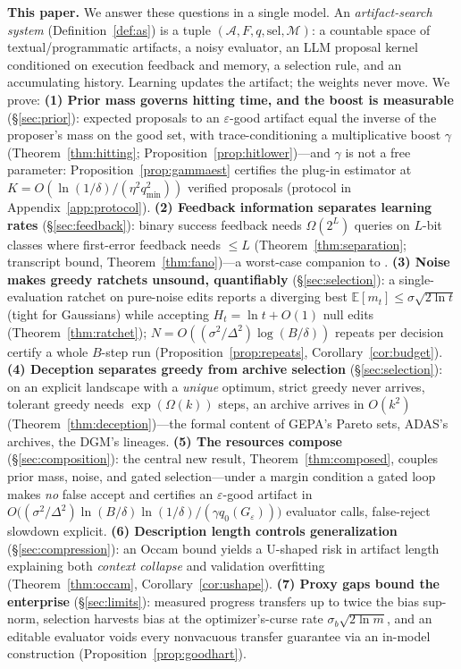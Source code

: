 \documentclass{article}
\theoremstyle{plain}
\theoremstyle{definition}
\theoremstyle{remark}
\newcommand{\A}{\mathcal{A}}
\newcommand{\M}{\mathcal{M}}
\newcommand{\E}{\mathbb{E}}
\newcommand{\sel}{\mathrm{sel}}
\newcommand{\eps}{\varepsilon}
\begin{document}
\textbf{This paper.} We answer these questions in a single model. An \emph{artifact-search system} (Definition~\ref{def:as}) is a tuple $(\A, F, q, \sel, \M)$: a countable space of textual/programmatic artifacts, a noisy evaluator, an LLM proposal kernel conditioned on execution feedback and memory, a selection rule, and an accumulating history. Learning updates the artifact; the weights never move. We prove:
\textbf{(1) Prior mass governs hitting time, and the boost is measurable} (\S\ref{sec:prior}): expected proposals to an $\eps$-good artifact equal the inverse of the proposer's mass on the good set, with trace-conditioning a multiplicative boost $\gamma$ (Theorem~\ref{thm:hitting}; Proposition~\ref{prop:hitlower})---and $\gamma$ is not a free parameter: Proposition~\ref{prop:gammaest} certifies the plug-in estimator at $K = O(\ln(1/\delta)/(\eta^2 q_{\min}^2))$ verified proposals (protocol in Appendix~\ref{app:protocol}).
\textbf{(2) Feedback information separates learning rates} (\S\ref{sec:feedback}): binary success feedback needs $\Omega(2^L)$ queries on $L$-bit classes where first-error feedback needs $\le L$ (Theorem~\ref{thm:separation}; transcript bound, Theorem~\ref{thm:fano})---a worst-case companion to \citet{xu2025llf}.
\textbf{(3) Noise makes greedy ratchets unsound, quantifiably} (\S\ref{sec:selection}): a single-evaluation ratchet on pure-noise edits reports a diverging best $\E[m_t] \le \sigma\sqrt{2\ln t}$ (tight for Gaussians) while accepting $H_t = \ln t + O(1)$ null edits (Theorem~\ref{thm:ratchet}); $N = O((\sigma^2/\Delta^2)\log(B/\delta))$ repeats per decision certify a whole $B$-step run (Proposition~\ref{prop:repeats}, Corollary~\ref{cor:budget}).
\textbf{(4) Deception separates greedy from archive selection} (\S\ref{sec:selection}): on an explicit landscape with a \emph{unique} optimum, strict greedy never arrives, tolerant greedy needs $\exp(\Omega(k))$ steps, an archive arrives in $O(k^2)$ (Theorem~\ref{thm:deception})---the formal content of GEPA's Pareto sets, ADAS's archives, the DGM's lineages.
\textbf{(5) The resources compose} (\S\ref{sec:composition}): the central new result, Theorem~\ref{thm:composed}, couples prior mass, noise, and gated selection---under a margin condition a gated loop makes \emph{no} false accept and certifies an $\eps$-good artifact in $O\big((\sigma^2/\Delta^2)\ln(B/\delta)\ln(1/\delta)/(\gamma q_0(G_\eps))\big)$ evaluator calls, false-reject slowdown explicit.
\textbf{(6) Description length controls generalization} (\S\ref{sec:compression}): an Occam bound yields a U-shaped risk in artifact length explaining both \emph{context collapse} and validation overfitting (Theorem~\ref{thm:occam}, Corollary~\ref{cor:ushape}).
\textbf{(7) Proxy gaps bound the enterprise} (\S\ref{sec:limits}): measured progress transfers up to twice the bias sup-norm, selection harvests bias at the optimizer's-curse rate $\sigma_b\sqrt{2\ln m}$, and an editable evaluator voids every nonvacuous transfer guarantee via an in-model construction (Proposition~\ref{prop:goodhart}).
\end{document}
